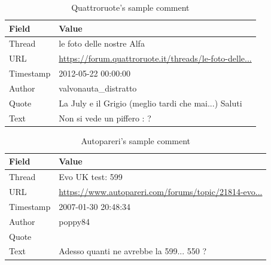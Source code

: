 \begin{table}[ht]
	\centering
	\begin{tabular}{l | l}
		Field & Value \\
		\hline 
		Thread & le foto delle nostre Alfa\\
		URL & \url{https://forum.quattroruote.it/threads/le-foto-delle...}\\
		Timestamp & 2012-05-22 00:00:00\\
		Author & valvonauta\_distratto\\
		Quote & La July e il Grigio (meglio tardi che mai...) Saluti\\
		Text & Non si vede un piffero : ? 
	\end{tabular}
	\caption{Quattroruote's sample comment}
	\label{tab:quattroruote-comment}
\end{table}

\begin{table}[ht]
	\centering
	\begin{tabular}{l | l}
		Field & Value \\
		\hline 
		Thread & Evo UK test: 599 \\
		URL & \url{https://www.autopareri.com/forums/topic/21814-evo...}\\
		Timestamp & 2007-01-30 20:48:34\\
		Author & poppy84\\
		Quote & \\
		Text & Adesso quanti ne avrebbe la 599... 550 ? 
	\end{tabular}
	\caption{Autopareri's sample comment}
	\label{tab:autopareri-comment}
\end{table}

